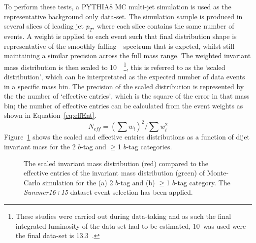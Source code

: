 To perform these tests, a PYTHIA8 MC multi-jet simulation is used as the representative background only data-set.
The simulation sample is produced in several slices of leading jet $p_{T}$, where each slice contains the same number of events.
A weight is applied to each event such that final distribution shape is representative of the smoothly falling~\mjj~spectrum that is expcted,
whilst still maintaining a similar precision across the full mass range.
The weighted invariant mass distribution is then scaled to 10~\ifb~\footnote{
  These studies were carried out during data-taking
  and as such the final integrated luminosity of the data-set had to be estimated,
  10~\ifb was used were the final data-set is 13.3~\ifb.
},
this is referred to as the  `scaled distribution', which can be interpretated as the expected number of data events in a specific mass bin. 
The precision of the scaled distribution is represented by the the number of `effective entries',
which is the square of the error in that mass bin; the number of effective entries can be calculated from the event weights as shown in Equation~\ref{eq:effEnt}.
\begin{equation}
  N_{eff} = (\sum{w_i})^2 / \sum{w_i^2}
  \label{eq:effEnt}
\end{equation}
Figure~\ref{fig:effEnt} shows the scaled and effective entries distributions as a function of dijet invariant mass for the 2 $b$-tag and $\geq$1 $b$-tag categories. 

\begin{figure}[!ht]
  \begin{center}
    \captionsetup[subfigure]{aboveskip=0pt,justification=centering}
  \end{center}
  \caption{The scaled invariant mass distribution (red) compared to the
    effective entries of the invariant mass distribution (green)
    of Monte-Carlo simulation for the (a) 2 $b$-tag and (b) $\geq$1 $b$-tag category.
    The \textit{Summer16+15} dataset event selection has been applied.}
  \label{fig:effEnt}
\end{figure}

